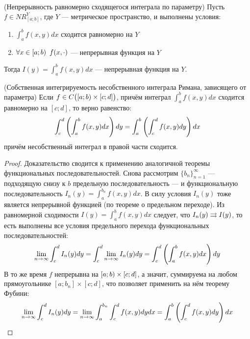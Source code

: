 \begin{corollary} (Непрерывность равномерно сходящегося интеграла по параметру) \label{parametrized_integral_continuity}
	Пусть $f \in NR_{[a; b]}^Y$, где $Y$ --- метрическое пространство, и выполнены условия:
	\begin{enumerate}
		\item $\int_a^b f(x, y)dx$ сходится равномерно на $Y$
		
		\item $\forall x \in \left[a; b\right) \ f(x, \cdot)$ --- непрерывная функция на $Y$
	\end{enumerate}
	Тогда $I(y) = \int_a^b f(x, y) dx$ --- непрерывная функция на $Y$.
\end{corollary}

\begin{theorem} (Собственная интегрируемость несобственного интеграла Римана, зависящего от параметра)
	Если $f \in C\big(\! \left[a; b\right) \times [c; d]\big)$, причём интеграл $\int_a^b f(x, y)dx$ сходится равномерно на $[c; d]$, то верно равенство:
	\[
		\int_c^d \left(\int_a^b f(x, y)dx\right)dy = \int_a^b \left(\int_c^d f(x, y)dy\right)dx
	\]
	причём несобственный интеграл в правой части сходится.
\end{theorem}

\begin{proof}
	Доказательство сводится к применению аналогичной теоремы функциональных последовательностей. Снова рассмотрим $\{b_n\}_{n = 1}^\infty$ --- подходящую снизу к $b$ предельную последовательность --- и функциональную последовательность $I_n(y) = \int_a^{b_n} f(x, y)dx$. В силу условия $I_n(y)$ тоже является непрерывной функцией (по теореме о предельном переходе). Из равномерной сходимости $I(y) = \int_a^b f(x, y)dx$ следует, что $I_n(y) \rightrightarrows I(y)$, то есть выполнены все условия предельного перехода функциональных последовательностей:
	\[
		\lim_{n \to \infty} \int_c^d I_n(y)dy = \int_c^d \lim_{n \to \infty} I_n(y)dy = \int_c^d \left(\int_a^b f(x, y)dx\right)dy
	\]
	В то же время $f$ непрерывна на $\left[a; b\right) \times [c; d]$, а значит, суммируема на любом прямоугольнике $[a; b_n] \times [c; d]$, что позволяет применить на нём теорему Фубини:
	\[
		\lim_{n \to \infty} \int_c^d I_n(y)dy = \lim_{n \to \infty} \int_a^{b_n} \int_c^d f(x, y)dydx = \int_a^b \left(\int_c^d f(x, y)dy\right)dx
	\]
\end{proof}

